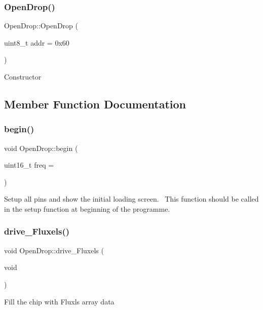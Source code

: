 \subsubsection{\texorpdfstring{Open\+Drop()}{OpenDrop()}}
{\footnotesize\ttfamily Open\+Drop\+::\+Open\+Drop (\begin{DoxyParamCaption}\item[{uint8\+\_\+t}]{addr = {\ttfamily 0x60} }\end{DoxyParamCaption})}

Constructor 

\subsection{Member Function Documentation}
\mbox{\label{class_open_drop_a22211279e88f493dc8fa56248cf74bd1}} 
\subsubsection{\texorpdfstring{begin()}{begin()}}
{\footnotesize\ttfamily void Open\+Drop\+::begin (\begin{DoxyParamCaption}\item[{uint16\+\_\+t}]{freq = {} }\end{DoxyParamCaption})}

Setup all pins and show the initial loading screen.~\newline
This function should be called in the setup function at beginning of the programme.   \mbox{\label{class_open_drop_a45775dc543679acd609ad58da6a79db0}} 
\subsubsection{\texorpdfstring{drive\+\_\+\+Fluxels()}{drive\_Fluxels()}}
{\footnotesize\ttfamily void Open\+Drop\+::drive\+\_\+\+Fluxels (\begin{DoxyParamCaption}\item[{void}]{ }\end{DoxyParamCaption})}

Fill the chip with Fluxls array data   \mbox{\label{class_open_drop_ac9894f9bc445bff9c94b6ad8de7aa70b}} 
